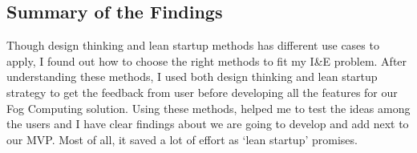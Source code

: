 \subsection{Summary of the Findings}
Though design thinking and lean startup methods has different use cases to apply, I found out how to choose the right methods to fit my I\&E problem. After understanding these methods, I used both design thinking and lean startup strategy to get the feedback from user before developing all the features for our Fog Computing solution. Using these methods, helped me to test the ideas among the users and I have clear findings about we are going to develop and add next to our \ac{MVP}. Most of all, it saved a lot of effort as `lean startup' promises. 

